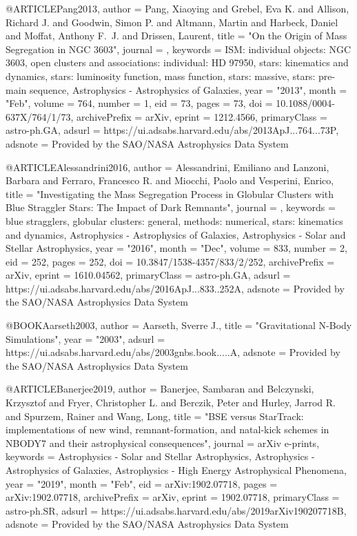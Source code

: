 \documentclass[twocolumn,tighten]{aastex63}
\begin{document}
@ARTICLE{Pang2013,
       author = {{Pang}, Xiaoying and {Grebel}, Eva K. and {Allison}, Richard J. and
         {Goodwin}, Simon P. and {Altmann}, Martin and {Harbeck}, Daniel and
         {Moffat}, Anthony F.~J. and {Drissen}, Laurent},
        title = "{On the Origin of Mass Segregation in NGC 3603}",
      journal = {\apj},
     keywords = {ISM: individual objects: NGC 3603, open clusters and associations: individual: HD 97950, stars: kinematics and dynamics, stars: luminosity function, mass function, stars: massive, stars: pre-main sequence, Astrophysics - Astrophysics of Galaxies},
         year = "2013",
        month = "Feb",
       volume = {764},
       number = {1},
          eid = {73},
        pages = {73},
          doi = {10.1088/0004-637X/764/1/73},
archivePrefix = {arXiv},
       eprint = {1212.4566},
 primaryClass = {astro-ph.GA},
       adsurl = {https://ui.adsabs.harvard.edu/abs/2013ApJ...764...73P},
      adsnote = {Provided by the SAO/NASA Astrophysics Data System}
}

@ARTICLE{Alessandrini2016,
       author = {{Alessandrini}, Emiliano and {Lanzoni}, Barbara and
         {Ferraro}, Francesco R. and {Miocchi}, Paolo and {Vesperini}, Enrico},
        title = "{Investigating the Mass Segregation Process in Globular Clusters with Blue Straggler Stars: The Impact of Dark Remnants}",
      journal = {\apj},
     keywords = {blue stragglers, globular clusters: general, methods: numerical, stars: kinematics and dynamics, Astrophysics - Astrophysics of Galaxies, Astrophysics - Solar and Stellar Astrophysics},
         year = "2016",
        month = "Dec",
       volume = {833},
       number = {2},
          eid = {252},
        pages = {252},
          doi = {10.3847/1538-4357/833/2/252},
archivePrefix = {arXiv},
       eprint = {1610.04562},
 primaryClass = {astro-ph.GA},
       adsurl = {https://ui.adsabs.harvard.edu/abs/2016ApJ...833..252A},
      adsnote = {Provided by the SAO/NASA Astrophysics Data System}
}

@BOOK{Aarseth2003,
       author = {{Aarseth}, Sverre J.},
        title = "{Gravitational N-Body Simulations}",
         year = "2003",
       adsurl = {https://ui.adsabs.harvard.edu/abs/2003gnbs.book.....A},
      adsnote = {Provided by the SAO/NASA Astrophysics Data System}
}

@ARTICLE{Banerjee2019,
       author = {{Banerjee}, Sambaran and {Belczynski}, Krzysztof and
         {Fryer}, Christopher L. and {Berczik}, Peter and {Hurley}, Jarrod R. and
         {Spurzem}, Rainer and {Wang}, Long},
        title = "{BSE versus StarTrack: implementations of new wind, remnant-formation, and natal-kick schemes in NBODY7 and their astrophysical consequences}",
      journal = {arXiv e-prints},
     keywords = {Astrophysics - Solar and Stellar Astrophysics, Astrophysics - Astrophysics of Galaxies, Astrophysics - High Energy Astrophysical Phenomena},
         year = "2019",
        month = "Feb",
          eid = {arXiv:1902.07718},
        pages = {arXiv:1902.07718},
archivePrefix = {arXiv},
       eprint = {1902.07718},
 primaryClass = {astro-ph.SR},
       adsurl = {https://ui.adsabs.harvard.edu/abs/2019arXiv190207718B},
      adsnote = {Provided by the SAO/NASA Astrophysics Data System}
}
\end{document}
